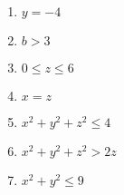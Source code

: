 \documentclass[../practica_01.tex]{subfiles}
\begin{document}
    \begin{enumerate}
        \item $y = -4$ 
        \item $b > 3$
        \item $0 \leq z \leq 6$
        \item $x = z$
        \item $x^2+y^2+z^2 \leq 4$
        \item $x^2+y^2+z^2 > 2z$
        \item $x^2 + y^2 \leq 9$
    \end{enumerate}
\end{document}
